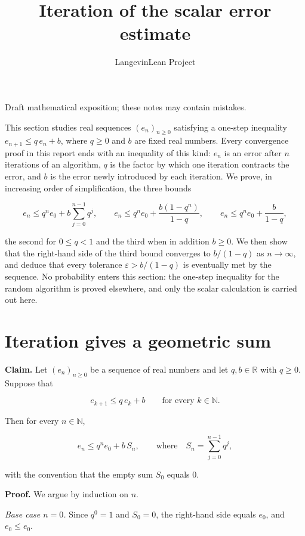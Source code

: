 \documentclass[11pt,a4paper]{article}
\title{\texorpdfstring{Iteration of the scalar error estimate}{Iteration of the scalar error estimate}}
\author{LangevinLean Project}
\date{}
\begin{document}
\maketitle
Draft mathematical exposition; these notes may contain mistakes.


This section studies real sequences \((e_n)_{n\ge0}\) satisfying a one-step inequality \(e_{n+1}\le q\,e_n+b\), where \(q\ge0\) and \(b\) are fixed real numbers. Every convergence proof in this report ends with an inequality of this kind: \(e_n\) is an error after \(n\) iterations of an algorithm, \(q\) is the factor by which one iteration contracts the error, and \(b\) is the error newly introduced by each iteration. We prove, in increasing order of simplification, the three bounds


\[e_n\le q^ne_0+b\sum_{j=0}^{n-1}q^j,\qquad e_n\le q^ne_0+\frac{b(1-q^n)}{1-q},\qquad e_n\le q^ne_0+\frac{b}{1-q},\]


the second for \(0\le q<1\) and the third when in addition \(b\ge0\). We then show that the right-hand side of the third bound converges to \(b/(1-q)\) as \(n\to\infty\), and deduce that every tolerance \(\varepsilon>b/(1-q)\) is eventually met by the sequence. No probability enters this section: the one-step inequality for the random algorithm is proved elsewhere, and only the scalar calculation is carried out here.


\section{\texorpdfstring{Iteration gives a geometric sum}{Iteration gives a geometric sum}}


\textbf{Claim.} Let \((e_n)_{n\ge0}\) be a sequence of real numbers and let \(q,b\in\mathbb R\) with \(q\ge0\). Suppose that


\[e_{k+1}\le q\,e_k+b\qquad\text{for every }k\in\mathbb N.\]


Then for every \(n\in\mathbb N\),


\[e_n\le q^ne_0+b\,S_n,\qquad\text{where}\quad S_n=\sum_{j=0}^{n-1}q^j,\]


with the convention that the empty sum \(S_0\) equals \(0\).




\textbf{Proof.} We argue by induction on \(n\).




\emph{Base case \(n=0\).} Since \(q^0=1\) and \(S_0=0\), the right-hand side equals \(e_0\), and \(e_0\le e_0\).
\end{document}
